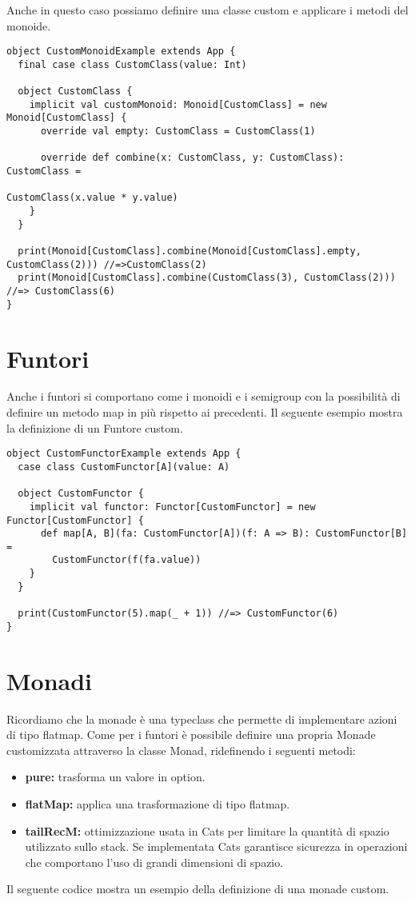 \noindent Anche in questo caso possiamo definire una classe custom e applicare i metodi del monoide.
\begin{verbatim}
object CustomMonoidExample extends App {
  final case class CustomClass(value: Int)

  object CustomClass {
    implicit val customMonoid: Monoid[CustomClass] = new Monoid[CustomClass] {
      override val empty: CustomClass = CustomClass(1)

      override def combine(x: CustomClass, y: CustomClass): CustomClass = 
                                                            CustomClass(x.value * y.value)
    }
  }

  print(Monoid[CustomClass].combine(Monoid[CustomClass].empty, CustomClass(2))) //=>CustomClass(2)
  print(Monoid[CustomClass].combine(CustomClass(3), CustomClass(2))) //=> CustomClass(6)
}
\end{verbatim}

\section{Funtori}
Anche i funtori si comportano come i monoidi e i semigroup con la possibilità di definire un metodo map in più rispetto ai precedenti. Il seguente esempio mostra la definizione di un Funtore custom.

\begin{verbatim}
object CustomFunctorExample extends App {
  case class CustomFunctor[A](value: A)

  object CustomFunctor {
    implicit val functor: Functor[CustomFunctor] = new Functor[CustomFunctor] {
      def map[A, B](fa: CustomFunctor[A])(f: A => B): CustomFunctor[B] =
        CustomFunctor(f(fa.value))
    }
  }

  print(CustomFunctor(5).map(_ + 1)) //=> CustomFunctor(6)
}
\end{verbatim}

\section{Monadi}
Ricordiamo che la monade è una typeclass che permette di implementare azioni di tipo flatmap. Come per i funtori è possibile definire una propria Monade customizzata attraverso la classe Monad, ridefinendo i seguenti metodi:
\begin{itemize}
    \item \textbf{pure:} trasforma un valore in option.
    \item \textbf{flatMap:} applica una trasformazione di tipo flatmap.
    \item \textbf{tailRecM:} ottimizzazione usata in Cats per limitare la quantità di spazio utilizzato sullo stack. Se implementata Cats garantisce sicurezza in operazioni che comportano l'uso di grandi dimensioni di spazio.
\end{itemize}
\noindent Il seguente codice mostra un esempio della definizione di una monade custom.

